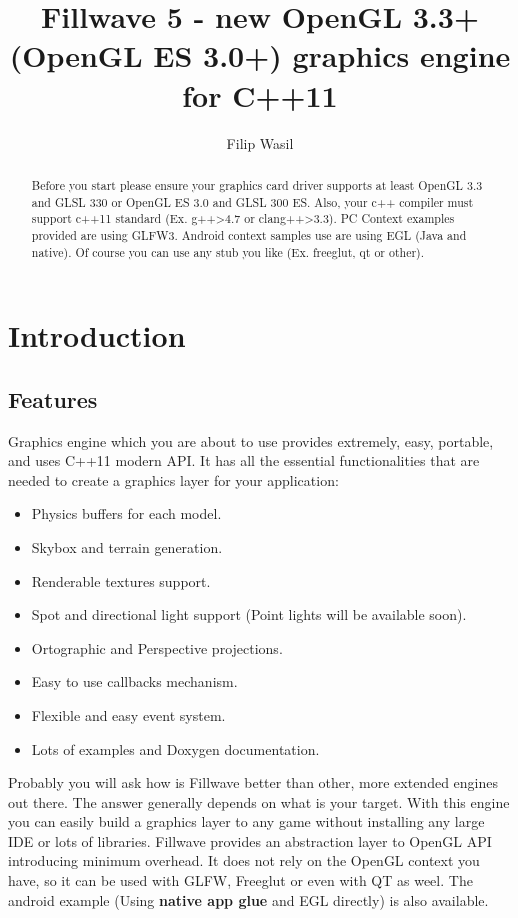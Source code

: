 \documentclass{article}
\begin{document}
\title{\textbf{Fillwave 5}
 - new OpenGL 3.3+ (OpenGL ES 3.0+) graphics engine for C++11 }
\author{Filip Wasil}

\maketitle

\begin{abstract}
Before you start please ensure your graphics card driver supports at least OpenGL 3.3 and GLSL 330 or OpenGL ES 3.0 and GLSL 300 ES. Also, your c++ compiler must support c++11 standard (Ex. g++\textgreater4.7 or clang++\textgreater3.3). PC Context examples provided are using GLFW3. Android context samples use are using EGL (Java and native). Of course you can use any stub you like (Ex. freeglut, qt or other).
\end{abstract}

\pagebreak
\tableofcontents

\newpage

\section{Introduction}
\subsection{Features}\label{sec:Features}
\indent \indent Graphics engine which you are about to use provides extremely, easy, portable, and uses C++11 modern API. It has all the essential functionalities that are needed to create a graphics layer for your application:

\begin{itemize}
  \item Physics buffers for each model.
  \item Skybox and terrain generation.
  \item Renderable textures support.
  \item Spot and directional light support (Point lights will be available soon).
  \item Ortographic and Perspective projections.
  \item Easy to use callbacks mechanism.
  \item Flexible and easy event system.
  \item Lots of examples and Doxygen documentation.
\end{itemize}

Probably you will ask how is Fillwave better than other, more extended engines out there. The answer generally depends on what is your target. With this engine you can easily build a graphics layer to any game without installing any large IDE or lots of libraries. Fillwave provides an abstraction layer to OpenGL API introducing minimum overhead. It does not rely on the OpenGL context you have, so it can be used with GLFW, Freeglut or even with QT as weel. The android example (Using \textbf{native app glue} and EGL directly) is also available.\newpage
\end{document}
